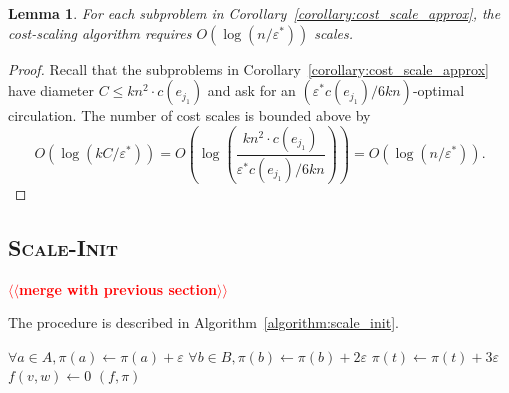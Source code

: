 \documentclass[11pt]{article}
\makeatletter
\def\eps{\varepsilon}
\theoremstyle{plain}
\newtheorem{lemma}{Lemma}[section]
\numberwithin{figure}{section}
\def\n@te#1{\textsf{\boldmath \textbf{$\langle\!\langle$#1$\rangle\!\rangle$}}\leavevmode}
\def\note#1{\textcolor{red}{\n@te{#1}}}
\makeatother
\begin{document}
\begin{lemma}
\label{lemma:goldberg_scales}
For each subproblem in Corollary~\ref{corollary:cost_scale_approx},
the cost-scaling algorithm requires $O(\log(n/\eps^*))$ scales.
\end{lemma}

\begin{proof}
Recall that the subproblems in Corollary~\ref{corollary:cost_scale_approx} have
diameter $C \leq kn^2 \cdot c(e_{j_1})$ and ask for an
$(\eps^* c(e_{j_1})/6kn)$-optimal circulation.
The number of cost scales is bounded above by
\begin{equation*}
	O(\log(kC/\eps^*))
	= O\left(\log\left(\frac{kn^2 \cdot c(e_{j_1})}{\eps^* c(e_{j_1})/6kn}\right)\right)
	= O(\log(n/\eps^*)).
\end{equation*}
\end{proof}

\subsection{\textsc{Scale-Init}}

\note{merge with previous section}

The procedure is described in Algorithm~\ref{algorithm:scale_init}.

\begin{figure*}[h]
\centering
\begin{minipage}{.5\linewidth}
\begin{algorithm}[H]
\caption{Scale Initialization}
\label{algorithm:scale_init}
\begin{algorithmic}[1]
	\State $\forall a \in A, \pi(a) \gets \pi(a) + \eps$
	\State $\forall b \in B, \pi(b) \gets \pi(b) + 2\eps$
	\State $\pi(t) \gets \pi(t) + 3\eps$
		\If{$c_\pi(w, v) < -\eps$}
			\State $f(v, w) \gets 0$
		\EndIf
	\EndFor
	\State\Return $(f, \pi)$
\EndFunction
\end{algorithmic}
\end{algorithm}
\end{minipage}
\end{figure*}
\end{document}
